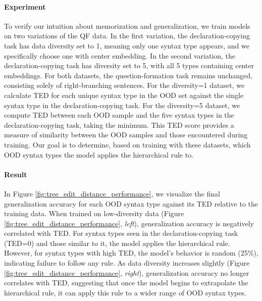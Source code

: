 \paragraph{Experiment} To verify our intuition about memorization and generalization, we train models on two variations of the QF data. In the first variation, the declaration-copying task has data diversity set to 1, meaning only one syntax type appears, and we specifically choose one with center embedding. In the second variation, the declaration-copying task has diversity set to 5, with all 5 types containing center embeddings. For both datasets, the question-formation task remains unchanged, consisting solely of right-branching sentences. 
For the diversity=1 dataset, we calculate TED for each unique syntax type in the OOD set against the single syntax type in the declaration-copying task. For the diversity=5 dataset, we compute TED between each OOD sample and the five syntax types in the declaration-copying task, taking the minimum. This TED score provides a measure of similarity between the OOD samples and those encountered during training.
Our goal is to determine, based on training with these datasets, which OOD syntax types the model applies the hierarchical rule to. 



\paragraph{Result} In Figure \ref{fig:tree_edit_distance_performance}, we visualize the final generalization accuracy for each OOD syntax type against its TED relative to the training data. When trained on low-diversity data (Figure \ref{fig:tree_edit_distance_performance}, \textit{left}), generalization accuracy is negatively correlated with TED. For syntax types seen in the declaration-copying task (TED=0) and those similar to it, the model applies the hierarchical rule. However, for syntax types with high TED, the model’s behavior is random (25\%), indicating failure to follow any rule. As data diversity increases slightly (Figure \ref{fig:tree_edit_distance_performance}, \textit{right}), generalization accuracy no longer correlates with TED, suggesting that once the model begins to extrapolate the hierarchical rule, it can apply this rule to a wider range of OOD syntax types.



\iffalse
